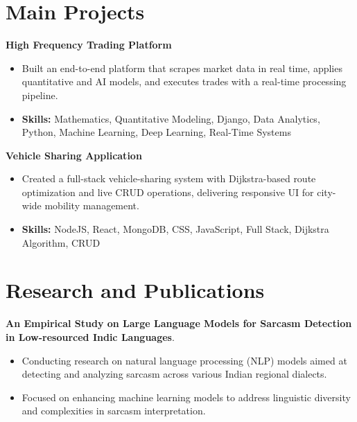 \documentclass[a4paper,11pt]{article}
\begin{document}
\section{\textbf{Main Projects}}

\vspace{1mm}
  \textbf{High Frequency Trading Platform  }
\vspace{-1.5mm} %
\begin{itemize}
  \item Built an end-to-end platform that scrapes market data in real time, applies quantitative and AI models, and executes trades with a real-time processing pipeline.
\vspace{-3mm}
  \item \textbf{Skills:} Mathematics, Quantitative Modeling, Django, Data Analytics, Python, Machine Learning, Deep Learning, Real-Time Systems
\end{itemize}


\vspace{1mm}
   \textbf{Vehicle Sharing Application }
\vspace{-1.5mm} %
\begin{itemize}
  \item Created a full-stack vehicle-sharing system with Dijkstra-based route optimization and live CRUD operations, delivering responsive UI for city-wide mobility management.
\vspace{-3mm}
  \item \textbf{Skills:} NodeJS, React, MongoDB, CSS, JavaScript, Full Stack, Dijkstra Algorithm, CRUD
\end{itemize}



\section{\textbf{Research and Publications} \hfill }
\vspace{1mm}
  \textbf{An Empirical Study on Large Language Models for Sarcasm Detection in Low-resourced Indic Languages}.
\vspace{-1mm} %
\begin{itemize}
  \item Conducting research on natural language processing (NLP) models aimed at detecting and analyzing sarcasm across various Indian regional dialects.
\vspace{-3mm}
  \item Focused on enhancing machine learning models to address linguistic diversity and complexities in sarcasm interpretation.
\end{itemize}
\end{document}
